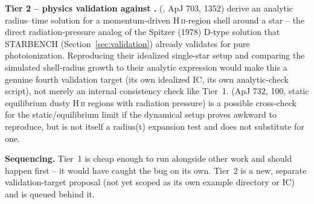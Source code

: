 \textbf{Tier 2 -- physics validation against
\citet{KrumholzMatzner2009}.} \citeauthor{KrumholzMatzner2009}
(\citeyear{KrumholzMatzner2009}, ApJ 703, 1352) derive an analytic
radius--time solution for a momentum-driven H\,\textsc{ii}-region
shell around a star -- the direct radiation-pressure analog of the
Spitzer (1978) D-type solution that STARBENCH
(Section~\ref{sec:validation}) already validates for pure
photoionization. Reproducing their idealized single-star setup and
comparing the simulated shell-radius growth to their analytic
expression would make this a genuine fourth validation target
(its own idealized IC, its own analytic-check script), not merely an
internal consistency check like Tier~1. \citet{Draine2011} (ApJ 732,
100, static equilibrium dusty H\,\textsc{ii} regions with radiation
pressure) is a possible cross-check for the static/equilibrium limit
if the dynamical \citet{KrumholzMatzner2009} setup proves awkward to
reproduce, but is not itself a radius(t) expansion test and does not
substitute for one.

\textbf{Sequencing.} Tier~1 is cheap enough to run alongside other
work and should happen first -- it would have caught the
 bug on its own. Tier~2 is a new, separate
validation-target proposal (not yet scoped as its own example
directory or IC) and is queued behind it.
